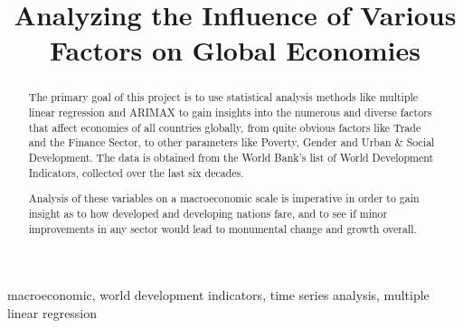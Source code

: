 \documentclass[conference]{IEEEtran}
\begin{document}
\title{Analyzing the Influence of Various Factors on Global Economies}

\author{
\and
{}
\and
{}
}

\maketitle

\begin{abstract}
The primary goal of this project is to use statistical analysis methods 
like multiple linear regression and ARIMAX to gain insights 
into the numerous and diverse factors that affect economies 
of all countries globally, from quite obvious factors like 
Trade and the Finance Sector, to other parameters like Poverty, 
Gender and Urban \& Social Development. The data is obtained from the 
World Bank's list of World Development Indicators, collected over the 
last six decades. 

Analysis of these variables on a macroeconomic scale is imperative in 
order to gain insight as to how developed and developing nations fare, 
and to see if minor improvements in any sector would lead to 
monumental change and growth overall. \\
\end{abstract}

\begin{IEEEkeywords}
macroeconomic, world development indicators, time series analysis, multiple linear regression
\end{IEEEkeywords}
\end{document}

